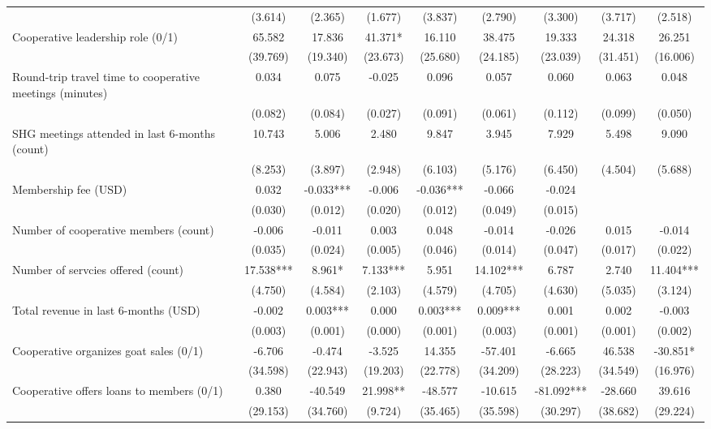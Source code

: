 \documentclass[11pt]{article}
\begin{document}
\begin{landscape}
\begin{table}[H]
{\begin{tabularx}{1.8\linewidth}{lcccccccc}
 & (3.614) & (2.365) & (1.677) & (3.837) & (2.790) & (3.300) & (3.717) & (2.518) \\
Cooperative leadership role (0/1) & 65.582 & 17.836 & 41.371* & 16.110 & 38.475 & 19.333 & 24.318 & 26.251 \\
 & (39.769) & (19.340) & (23.673) & (25.680) & (24.185) & (23.039) & (31.451) & (16.006) \\
Round-trip travel time to cooperative meetings (minutes) & 0.034 & 0.075 & -0.025 & 0.096 & 0.057 & 0.060 & 0.063 & 0.048 \\
 & (0.082) & (0.084) & (0.027) & (0.091) & (0.061) & (0.112) & (0.099) & (0.050) \\
SHG meetings attended in last 6-months (count) & 10.743 & 5.006 & 2.480 & 9.847 & 3.945 & 7.929 & 5.498 & 9.090 \\
 & (8.253) & (3.897) & (2.948) & (6.103) & (5.176) & (6.450) & (4.504) & (5.688) \\
Membership fee (USD) & 0.032 & -0.033*** & -0.006 & -0.036*** & -0.066 & -0.024 &  &  \\
 & (0.030) & (0.012) & (0.020) & (0.012) & (0.049) & (0.015) &  &  \\
Number of cooperative members (count) & -0.006 & -0.011 & 0.003 & 0.048 & -0.014 & -0.026 & 0.015 & -0.014 \\
 & (0.035) & (0.024) & (0.005) & (0.046) & (0.014) & (0.047) & (0.017) & (0.022) \\
Number of servcies offered (count) & 17.538*** & 8.961* & 7.133*** & 5.951 & 14.102*** & 6.787 & 2.740 & 11.404*** \\
 & (4.750) & (4.584) & (2.103) & (4.579) & (4.705) & (4.630) & (5.035) & (3.124) \\
Total revenue in last 6-months (USD) & -0.002 & 0.003*** & 0.000 & 0.003*** & 0.009*** & 0.001 & 0.002 & -0.003 \\
 & (0.003) & (0.001) & (0.000) & (0.001) & (0.003) & (0.001) & (0.001) & (0.002) \\
Cooperative organizes goat sales (0/1) & -6.706 & -0.474 & -3.525 & 14.355 & -57.401 & -6.665 & 46.538 & -30.851* \\
 & (34.598) & (22.943) & (19.203) & (22.778) & (34.209) & (28.223) & (34.549) & (16.976) \\
Cooperative offers loans to members (0/1) & 0.380 & -40.549 & 21.998** & -48.577 & -10.615 & -81.092*** & -28.660 & 39.616 \\
 & (29.153) & (34.760) & (9.724) & (35.465) & (35.598) & (30.297) & (38.682) & (29.224) \\

\end{tabularx}}
\end{table}
\end{landscape}
\end{document}
